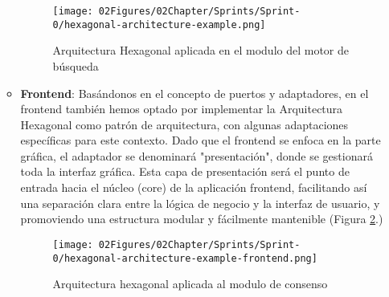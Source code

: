 \begin{itemize}
\begin{itemize}
        \begin{figure}[H]
            \centering
            \texttt{[image: 02Figures/02Chapter/Sprints/Sprint-0/hexagonal-architecture-example.png]}
            \caption{Arquitectura Hexagonal aplicada en el modulo del motor de búsqueda}
            \label{fig:hexagonal-architecture-example-backend}
        \end{figure}
        \item \textbf{Frontend}: Basándonos en el concepto de puertos y adaptadores, en el frontend también hemos optado por  implementar la Arquitectura Hexagonal \cite{ARQUITECTURA-HEXAGONAL} como patrón de arquitectura, con algunas adaptaciones específicas para este contexto. Dado que el frontend se enfoca en la parte gráfica, el adaptador se denominará "presentación", donde se gestionará toda la interfaz gráfica. Esta capa de presentación será el punto de entrada hacia el núcleo (core) de la aplicación frontend, facilitando así una separación clara entre la lógica de negocio y la interfaz de usuario, y promoviendo una estructura modular y fácilmente mantenible (Figura \ref{fig:hexagonal-architecture-example-frontend}.)
        \begin{figure}[H]
            \centering
            \texttt{[image: 02Figures/02Chapter/Sprints/Sprint-0/hexagonal-architecture-example-frontend.png]}
            \caption{Arquitectura hexagonal aplicada al modulo de consenso}
            \label{fig:hexagonal-architecture-example-frontend}
        \end{figure}
    \end{itemize}
\end{itemize}